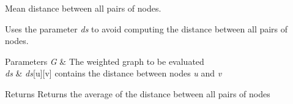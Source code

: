 Mean distance between all pairs of nodes. 

Uses the parameter {\itshape ds} to avoid computing the distance between all pairs of nodes. 
\begin{DoxyParams}{Parameters}
{\em G} & The weighted graph to be evaluated \\
\hline
{\em ds} & {\itshape ds}\mbox{[}u\mbox{]}\mbox{[}v\mbox{]} contains the distance between nodes {\itshape u} and {\itshape v} \\
\hline
\end{DoxyParams}
\begin{DoxyReturn}{Returns}
Returns the average of the distance between all pairs of nodes 
\end{DoxyReturn}
